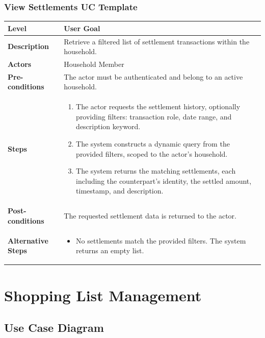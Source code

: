 \subsubsection{View Settlements UC Template}
\begin{longtable}{|p{3.5cm}|p{10.3cm}|}
\hline
\rowcolor{UCRow} \textbf{Level} & User Goal \\ \hline
\textbf{Description} & Retrieve a filtered list of settlement transactions within the household. \\ \hline
\rowcolor{UCRow} \textbf{Actors} & Household Member \\ \hline
\textbf{Pre-conditions} & The actor must be authenticated and belong to an active household. \\ \hline
\rowcolor{UCRow} \textbf{Steps} &
\begin{enumerate}[nosep, leftmargin=*]
    \item The actor requests the settlement history, optionally providing filters: transaction role, date range, and description keyword.
    \item The system constructs a dynamic query from the provided filters, scoped to the actor's household.
    \item The system returns the matching settlements, each including the counterpart's identity, the settled amount, timestamp, and description.
\end{enumerate} \\ \hline
\textbf{Post-conditions} & The requested settlement data is returned to the actor. \\ \hline
\rowcolor{UCRow} \textbf{Alternative Steps} &
\begin{itemize}[nosep, leftmargin=2.5em]
    \item[\textbf{A1.}] No settlements match the provided filters. The system returns an empty list.
\end{itemize} \\ \hline
\end{longtable}

\section{Shopping List Management}

\subsection{Use Case Diagram}

